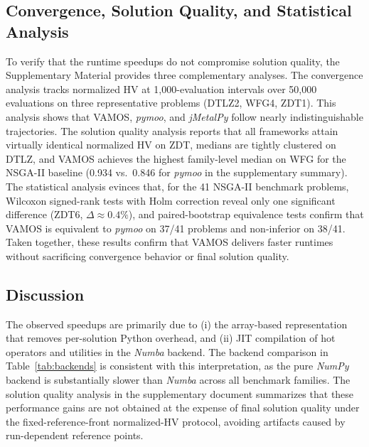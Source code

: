 \documentclass[final,5p,times,twocolumn]{elsarticle}
\newcommand{\VAMOS}{VAMOS}
\begin{document}

\subsection{Convergence, Solution Quality, and Statistical Analysis}
To verify that the runtime speedups do not compromise solution quality, the Supplementary Material provides three complementary analyses. The convergence analysis tracks normalized HV at 1{,}000-evaluation intervals over 50{,}000 evaluations on three representative problems (DTLZ2, WFG4, ZDT1). This analysis shows that \VAMOS{}, \textit{pymoo}, and \textit{jMetalPy} follow nearly indistinguishable trajectories. The solution quality analysis reports that all frameworks attain virtually identical normalized HV on ZDT, medians are tightly clustered on DTLZ, and \VAMOS{} achieves the highest family-level median on WFG for the NSGA-II baseline (0.934 vs.\ 0.846 for \textit{pymoo} in the supplementary summary). The statistical analysis evinces that, for the 41 NSGA-II benchmark problems, Wilcoxon signed-rank tests with Holm correction reveal only one significant difference (ZDT6, $\Delta \approx 0.4\%$), and paired-bootstrap equivalence tests confirm that \VAMOS{} is equivalent to \textit{pymoo} on 37/41 problems and non-inferior on 38/41. Taken together, these results confirm that \VAMOS{} delivers faster runtimes without sacrificing convergence behavior or final solution quality.

\subsection{Discussion}
\label{sec:discussion}

The observed speedups are primarily due to (i) the array-based representation that removes per-solution Python overhead, and (ii) JIT compilation of hot operators and utilities in the \textit{Numba} backend. The backend comparison in Table~\ref{tab:backends} is consistent with this interpretation, as the pure \textit{NumPy} backend is substantially slower than \textit{Numba} across all benchmark families. The solution quality analysis in the supplementary document summarizes that these performance gains are not obtained at the expense of final solution quality under the fixed-reference-front normalized-HV protocol, avoiding artifacts caused by run-dependent reference points.
\end{document}
